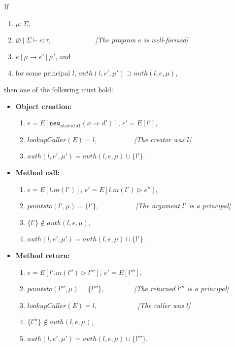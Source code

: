 \documentclass{llncs}
\newcommand{\keywadj}[1]{\mathtt{#1}}
\begin{document}
\begin{theorem} If
\begin{enumerate}
\item $\mu : \Sigma$,
\item $\varnothing~|~\Sigma \vdash e : \tau$, {\emph{~~~~~~~~~~~~[The program $e$ is well-formed]}}
\item $e~|~\mu \longrightarrow e'~|~\mu'$, and
\item for some principal $l$, $auth(l, e', \mu') \supset auth(l, e, \mu)$,
\end{enumerate}
then one of the following must hold:
\begin{itemize}
  \item \textbf{Object creation:}
  \begin{enumerate}
  \item $e = E[\keywadj{new}_{\keywadj{stateful}}(x \Rightarrow d')]$, $e' = E[l']$,
  \item $lookupCaller(E) = l$, {\emph{~~~~~~~~~~[The creator was $l$]}}
  \item $auth(l, e', \mu') = auth(l, e, \mu) \cup \{ l' \}$.\\
  \end{enumerate}
  \item \textbf{Method call:}
  \begin{enumerate}
  \item $e = E[l.m(l')]$, $e' = E[l.m(l') \rhd e'']$,
  \item $pointsto(l',\mu) = \{ l' \}$, {\emph{~~~~~~~~~~[The argument $l'$ is a principal]}}
  \item $\{ l' \} \not\in auth(l, e, \mu)$,
  \item $auth(l, e', \mu') = auth(l, e, \mu) \cup \{ l' \}$.\\
  \end{enumerate}
  \item \textbf{Method return:}
  \begin{enumerate}
  \item $e = E[l'.m(l'') \rhd l''']$, $e' = E[l''']$,
  \item $pointsto(l''',\mu) = \{ l''' \}$, {\emph{~~~~~~~~[The returned $l'''$ is a principal]}}
  \item $lookupCaller(E) = l$, {\emph{~~~~~~~~~~~[The caller was $l$]}}
  \item $\{ l''' \} \not\in auth(l, e, \mu)$,
  \item $auth(l, e', \mu') = auth(l, e, \mu) \cup \{ l''' \}$.\\
  \end{enumerate}
\end{itemize}

\end{theorem}
\end{document}
